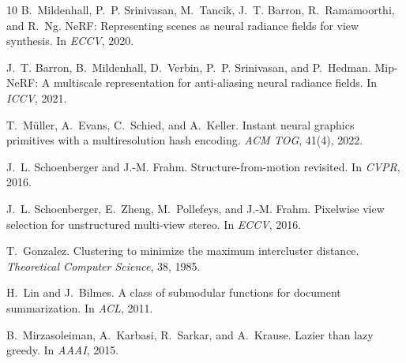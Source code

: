 \documentclass[10pt,twocolumn,letterpaper]{article}
\begin{document}
\begin{thebibliography}{10}\setlength{\itemsep}{-1mm}
B.~Mildenhall, P.~P. Srinivasan, M.~Tancik, J.~T. Barron, R.~Ramamoorthi, and R.~Ng.
\newblock NeRF: Representing scenes as neural radiance fields for view synthesis.
\newblock In \emph{ECCV}, 2020.

J.~T. Barron, B.~Mildenhall, D.~Verbin, P.~P. Srinivasan, and P.~Hedman.
\newblock Mip-NeRF: A multiscale representation for anti-aliasing neural radiance fields.
\newblock In \emph{ICCV}, 2021.

T.~M{\"u}ller, A.~Evans, C.~Schied, and A.~Keller.
\newblock Instant neural graphics primitives with a multiresolution hash encoding.
\newblock \emph{ACM TOG}, 41(4), 2022.

J.~L. Schoenberger and J.-M. Frahm.
\newblock Structure-from-motion revisited.
\newblock In \emph{CVPR}, 2016.

J.~L. Schoenberger, E.~Zheng, M.~Pollefeys, and J.-M. Frahm.
\newblock Pixelwise view selection for unstructured multi-view stereo.
\newblock In \emph{ECCV}, 2016.

T.~Gonzalez.
\newblock Clustering to minimize the maximum intercluster distance.
\newblock \emph{Theoretical Computer Science}, 38, 1985.

H.~Lin and J.~Bilmes.
\newblock A class of submodular functions for document summarization.
\newblock In \emph{ACL}, 2011.

B.~Mirzasoleiman, A.~Karbasi, R.~Sarkar, and A.~Krause.
\newblock Lazier than lazy greedy.
\newblock In \emph{AAAI}, 2015.
\end{thebibliography}
\end{document}
